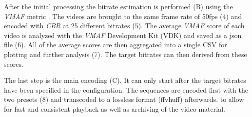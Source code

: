 After the initial processing the bitrate estimation is performed (B) using the \textit{VMAF} metric \cite{lin2013:mmf}. The videos are brought to the same frame rate of 50fps (4) and encoded with \textit{CBR} at 25 different bitrates (5). The average \textit{VMAF} score of each video is analyzed with the \textit{VMAF} Development Kit (VDK) \cite{web:vdk} and saved as a json file (6). All of the average scores are then aggregated into a single CSV for plotting and further analysis (7). The target bitrates can then derived from these scores.

The last step is the main encoding (C). It can only start after the target bitrates have been specified in the configuration. The sequences are encoded first with the two presets (8) and transcoded to a lossless format (ffvhuff) afterwards, to allow for fast and consistent playback as well as archiving of the video material.


